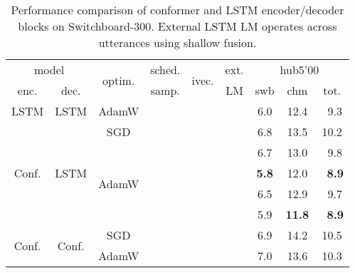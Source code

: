 \documentclass[a4paper]{article}
\begin{document}
\begin{table}
  \eightpt
  \centering
  \caption{Performance comparison of conformer and LSTM encoder/decoder blocks on Switchboard-300. External LSTM LM operates across utterances using shallow fusion.}
  \vspace{-3.5mm}
  \begin{tabular}{|@{}c@{}|@{}c@{}|@{}c@{}|@{}c@{}|@{}c@{}|@{}c@{}|c|c|@{}c@{}|}
    \hline
 \multicolumn{2}{|c|}{model} & \multirow{2}{*}{optim.} &  sched. & \multirow{2}{*}{ivec.} &  ext.        & \multicolumn{3}{c|}{hub5'00}  \\ \cline{1-2}\cline{7-9}
 enc.    &    dec.   &           &  samp.  &              &  LM          &     swb    &    chm     & \hspace{2mm}tot.\hspace{.5mm} \\
\hline
\hline
\multirow{1}{*}{LSTM}& \multirow{1}{*}{LSTM} &   
         AdamW   &  &  &  &   6.0      & 12.4       & \textcolor{white}{0}9.3 \\
\hline
\hline
\multirow{5}{*}{Conf.}   & \multirow{5}{*}{LSTM}   & \multirow{1}{*}{SGD} & \multirow{5}{*}{} & \hspace{7mm} & \hspace{6mm} &   6.8      & 13.5       & 10.2 \\ \cline{3-3}\cline{7-9}
         &           & \multirow{4}{*}{AdamW} &              &              &              &   6.7      & 13.0       & \textcolor{white}{0}9.8  \\ \cline{6-9}
\hspace{10mm} & \hspace{10mm} & \hspace{12mm} & \hspace{9mm} &              &  &  \bf 5.8      & 12.0       & \bf \textcolor{white}{0}8.9  \\ \cline{5-5}\cline{6-9}
         &           &           &              & \multirow{2}{*}{} &              &   6.5      & 12.9       & \textcolor{white}{0}9.7  \\ \cline{6-9}
         &           &           &              &              &  & 5.9      & \bf 11.8       & \bf \textcolor{white}{0}8.9  \\
\hline
\hline
\multirow{6}{*}{Conf.} & \multirow{6}{*}{Conf.} &   SGD     &              &              &              &   6.9      &  14.2      & 10.5 \\ \cline{3-3}\cline{7-9}
         &           & \multirow{5}{*}{AdamW} &              &              &              &   7.0      &  13.6      & 10.3 \\ \cline{4-4}\cline{7-9}

\end{tabular}
\end{table}
\end{document}
